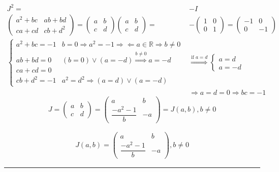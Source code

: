 \documentclass[
]{book}
\theoremstyle{definition}
\theoremstyle{definition}
\theoremstyle{definition}
\theoremstyle{definition}
\theoremstyle{remark}
\begin{document}
\[
\begin{aligned}
J^{2}= & -I\\
\begin{pmatrix}a^{2}+bc & ab+bd\\
ca+cd & cb+d^{2}
\end{pmatrix}=\begin{pmatrix}a & b\\
c & d
\end{pmatrix}\begin{pmatrix}a & b\\
c & d
\end{pmatrix}= & -\begin{pmatrix}1 & 0\\
0 & 1
\end{pmatrix}=\begin{pmatrix}-1 & 0\\
0 & -1
\end{pmatrix}\\
\begin{cases}
a^{2}+bc=-1 & b=0\Rightarrow a^{2}=-1\Rightarrow\Leftarrow a\in\mathbb{R}\Rightarrow b\ne0\\
ab+bd=0 & \left(b=0\right)\vee\left(a=-d\right)\overset{b\ne0}{\Rightarrow}a=-d\\
ca+cd=0\\
cb+d^{2}=-1 & a^{2}=d^{2}\Rightarrow\left(a=d\right)\vee\left(a=-d\right)
\end{cases} & \overset{\text{if }a=d}{\Rightarrow}\begin{cases}
a=d\\
a=-d
\end{cases}\\
 & \Rightarrow a=d=0\Rightarrow bc=-1
\end{aligned}
\]
\[
J=\begin{pmatrix}a & b\\
c & d
\end{pmatrix}=\begin{pmatrix}a & b\\
\dfrac{-a^{2}-1}{b} & -a
\end{pmatrix}=J\left(a,b\right),b\ne0
\]

\[
\begin{aligned}
J\left(a,b\right)=\begin{pmatrix}a & b\\
\dfrac{-a^{2}-1}{b} & -a
\end{pmatrix},b\ne0
\end{aligned}
\]

\begin{center}\rule{0.5\linewidth}{0.5pt}\end{center}
\end{document}
